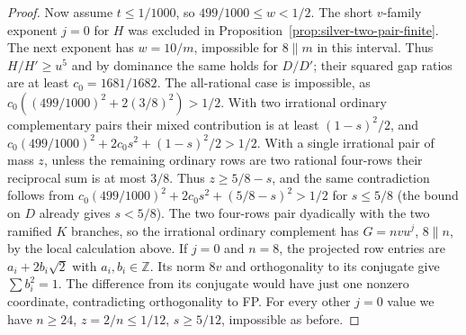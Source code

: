 \documentclass[11pt,reqno]{amsart}
\theoremstyle{remark}\newtheorem{remark}[theorem]{Remark}
\numberwithin{equation}{section}
\begin{document}
\begin{proof}
Now assume $t\le1/1000$, so $499/1000\le w<1/2$. The short
$v$-family exponent $j=0$ for $H$ was excluded in
Proposition~\ref{prop:silver-two-pair-finite}. The next exponent
has $w=10/m$, impossible for $8\parallel m$ in this interval.
Thus $H/H'\ge u^5$ and by dominance the same holds for $D/D'$;
their squared gap ratios are at least $c_0=1681/1682$.
The all-rational case is impossible, as
$c_0((499/1000)^2+2(3/8)^2)>1/2$.
With two irrational ordinary complementary pairs their mixed
contribution is at least $(1-s)^2/2$, and
$c_0(499/1000)^2+2c_0 s^2+(1-s)^2/2>1/2$.
With a single irrational pair of mass $z$, unless the remaining
ordinary rows are two rational four-rows their reciprocal sum
is at most $3/8$. Thus $z\ge5/8-s$, and the same contradiction
follows from $c_0(499/1000)^2+2c_0s^2+(5/8-s)^2>1/2$
for $s\le5/8$ (the bound on $D$ already gives $s<5/8$).
The two four-rows pair dyadically with the two ramified
$K$ branches, so the irrational ordinary complement has
$G=nv u^j$, $8\parallel n$, by the local calculation above.
If $j=0$ and $n=8$, the projected row entries are
$a_i+2b_i\sqrt2$ with $a_i,b_i\in\mathbb Z$.
Its norm $8v$ and orthogonality to its conjugate give
$\sum b_i^2=1$. The difference from its conjugate would have just
one nonzero coordinate, contradicting orthogonality to FP.
For every other $j=0$ value we have $n\ge24$, $z=2/n\le1/12$,
$s\ge5/12$, impossible as before.
\end{proof}
\end{document}
